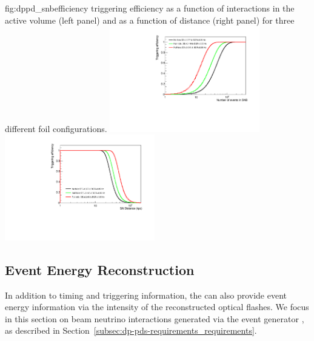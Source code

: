 \begin{dunefigure}{fig:dppd_snbefficiency}
     { triggering efficiency as a function of  interactions in the active volume (left panel) and as a function of  distance (right panel) for three different  foil configurations.}
     \includegraphics[width=0.49\textwidth]{graphics/dppd_snbefficiency_vs_snevents.pdf} \hfill
    \includegraphics[width=0.49\textwidth]{graphics/dppd_snbefficiency_vs_sndistance.pdf}
    \end{dunefigure}


\subsection{Event Energy Reconstruction}
\label{subsec:dp-pds-performance_calorimetry}

In addition to timing and triggering information, the  can also provide event energy information via the intensity of the reconstructed optical flashes. We focus in this section on beam neutrino interactions generated via the  event generator \cite{Andreopoulos:2009rq}, as described in Section~\ref{subsec:dp-pds-requirements_requirements}.

